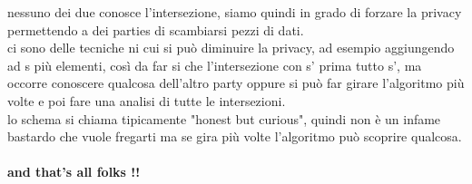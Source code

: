 \documentclass[12pt, oneside]{extbook} %
\begin{document}
nessuno dei due conosce l'intersezione, siamo quindi in grado di forzare la privacy permettendo a dei parties di scambiarsi pezzi di dati.\\ci sono delle tecniche ni cui si può diminuire la privacy, ad esempio aggiungendo ad s più elementi, così da far si che l'intersezione con s' prima tutto s', ma occorre conoscere qualcosa dell'altro party oppure si può far girare l'algoritmo più volte e poi fare una analisi di tutte le intersezioni.\\lo schema si chiama tipicamente "honest but curious", quindi non è un infame bastardo che vuole fregarti ma se gira più volte l'algoritmo può scoprire qualcosa.\\\\
\huge
\textbf{\textsf{and that's all folks !!}}
\end{document}

